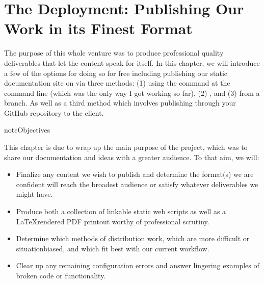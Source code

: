 \documentclass[letterpaper,12pt,english]{sphinxmanual}
\begin{document}
\sphinxstepscope


\chapter{The Deployment: Publishing Our Work in its Finest Format}
\label{\detokenize{_notebooks/03-the-deploy:the-deployment-publishing-our-work-in-its-finest-format}}\label{\detokenize{_notebooks/03-the-deploy::doc}}
\sphinxAtStartPar
The purpose of this whole venture was to produce professional quality deliverables that let the content speak for itself. In this chapter, we will introduce a few of the options for doing so \textendash{}for free\textendash{} including publishing our static documentation site on  via three methods: (1) using the  command at the command line (which was the only way I got working so far), (2) , and (3) from a branch. As well as a third method which involves publishing through your GitHub repository to the  client.

\begin{sphinxadmonition}{note}{Objectives}

\sphinxAtStartPar
This chapter is due to wrap up the main purpose of the project, which was to share our documentation and ideas with a greater audience. To that aim, we will:
\begin{itemize}
\item {} 
\sphinxAtStartPar
Finalize any content we wish to publish and determine the format(s) we are confident will reach the broadest audience or satisfy whatever deliverables we might have.

\item {} 
\sphinxAtStartPar
Produce both a collection of linkable static web scripts as well as a LaTeX\sphinxhyphen{}rendered PDF printout worthy of professional scrutiny.

\item {} 
\sphinxAtStartPar
Determine which methods of distribution work, which are more difficult or situation\sphinxhyphen{}biased, and which fit best with our current workflow.

\item {} 
\sphinxAtStartPar
Clear up any remaining configuration errors and answer lingering examples of broken code or functionality.

\end{itemize}
\end{sphinxadmonition}
\end{document}
